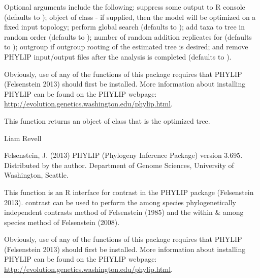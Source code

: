\documentclass[a4paper]{book}
\begin{document}
%
\begin{Details}\relax
Optional arguments include the following:  suppress some output to R console (defaults to );  object of class  - if supplied, then the model will be optimized on a fixed input topology;  perform global search (defaults to );  add taxa to tree in random order (defaults to );  number of random addition replicates for  (defaults to );  outgroup if outgroup rooting of the estimated tree is desired; and  remove PHYLIP input/output files after the analysis is completed (defaults to ).

Obviously, use of any of the functions of this package requires that PHYLIP (Felsenstein 2013) should first be installed. More information about installing PHYLIP can be found on the PHYLIP webpage: \url{http://evolution.genetics.washington.edu/phylip.html}.
\end{Details}
%
\begin{Value}
This function returns an object of class  that is the optimized tree.
\end{Value}
%
\begin{Author}\relax
Liam Revell 
\end{Author}
%
\begin{References}\relax
Felsenstein, J. (2013) PHYLIP (Phylogeny Inference Package) version 3.695. Distributed by the author. Department of Genome Sciences, University of Washington, Seattle.
\end{References}
%
\begin{SeeAlso}\relax
{}
\end{SeeAlso}
%
\begin{Description}\relax
This function is an R interface for contrast in the PHYLIP package (Felsenstein 2013). contrast can be used to perform the among species phylogenetically independent contrasts method of Felsenstein (1985) and the within \& among species method of Felsenstein (2008).

Obviously, use of any of the functions of this package requires that PHYLIP (Felsenstein 2013) should first be installed. More information about installing PHYLIP can be found on the PHYLIP webpage: \url{http://evolution.genetics.washington.edu/phylip.html}.
\end{Description}
\end{document}
